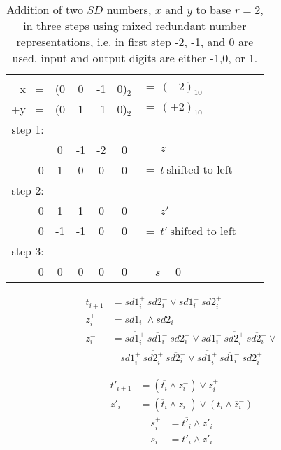 \documentclass[pageno]{jpaper}
\begin{document}
\begin{table}[t]
\centering%
\begin{tabular}{rcccclll}
\vspace{6pt}
\\
x \  = & (0 & 0 & -1 & 0)$_2$ & $= \ (-2)_{10}$ \\
+y \ = & (0 & 1 & -1 & 0)$_2$ & $= \ (+2)_{10}$ \\ 
\hline
\vspace{6pt}
step 1:\\
       & 0 & -1 & -2 & 0 & $= \ z$ \\
         0 & 1 &  0 &  0 & 0 & $= \ t \ \text{shifted to left}$ \\
\hline
\vspace{6pt}
step 2:\\ 
      0 &  1 &  1 & 0 & 0 & $= \ z'$ \\
      0 & -1 & -1 & 0 & 0 & $= \ t' \ \text{shifted to left}$ \\        
\hline
\vspace{6pt}
step 3:\\
     0 & 0 & 0 & 0 & 0 & = $s = 0$ \\
\hline
\end{tabular}
\caption{Addition of two $SD$ numbers, $x$ and $y$ to base $r=2$, in three steps using mixed redundant number representations, i.e. in first step -2, -1, and 0 are used, input and output digits are either -1,0, or 1.}
\label{table:Add_SD_SD_3steps}
\end{table}

\begin{align}
\label{eq:ADD_SD_SD_3S_1}
t_{i+1} &= {sd1^+_i} \ \overline {sd2^-_i} \vee \overline {sd1^-_i} \ {sd2^+_i} \\
z^+_i &= sd1_i^- \wedge sd2_i^- \nonumber \\
z^-_i &= \overline {sd1^+_i} \ \overline {sd1^-_i} \ {sd2^-_i} \vee sd1^-_i \ \overline {sd2^+_i} \ \overline {sd2^-_i} \vee \nonumber \\
& \ \ \ \  sd1^+_i \ \overline {sd2^+_i} \ \overline {sd2^-_i} \vee \overline {sd1^+_i} \ \overline {sd1^-_i} \ sd2^+_i \nonumber
\end{align}

\begin{align}
\label{eq:ADD_SD_SD_3S_2}
t'_{i+1} &= (\overline {t_i} \wedge z^-_i) \vee z^+_i \\
z'_i &= (\overline t_i \wedge z_i^-) \vee (t_i \wedge \overline z_i^-) \nonumber 
\end{align}
\begin{align}
\label{eq:ADD_SD_SD_3S_3}
s^+_i &= \overline {t'_i} \wedge z'_i \\
s^-_i &= t'_i \wedge z'_i \nonumber 
\end{align}
\end{document}
